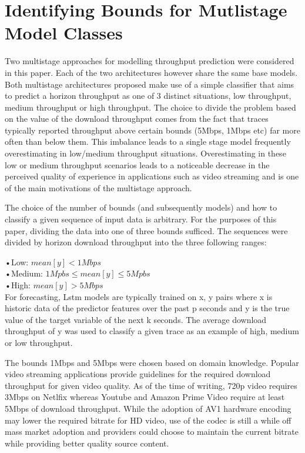 \section{Identifying Bounds for Mutlistage Model Classes}
\label{sec:bounds}
Two multistage approaches for modelling throughput prediction were considered in this paper. Each of the two architectures however share the same base models. Both multistage architectures proposed make use of a simple classifier that aims to predict a horizon throughput as one of 3 distinct situations, low throughput, medium throughput or high throughput. The choice to divide the problem based on the value of the download throughput comes from the fact that traces typically reported throughput above certain bounds (5Mbps, 1Mbps etc) far more often than below them. This imbalance leads to a single stage model frequently overestimating in low/medium throughput situations. Overestimating in these low or medium throughput scenarios leads to a noticeable decrease in the perceived quality of experience in applications such as video streaming \cite{raca2019improving} and is one of the main motivations of the multistage approach. 

The choice of the number of bounds (and subsequently models) and how to classify a given sequence of input data is arbitrary. For the purposes of this paper, dividing the data into one of three bounds sufficed. The sequences were divided by horizon download throughput into the three following ranges:

•Low: $ mean[y] < 1Mbps$ \\
•Medium: $1Mpbs \leq mean[y] \leq 5Mpbs$ \\
•High: $ mean[y] > 5Mbps$ \\

For forecasting, Lstm models are typically trained on x, y pairs where x is historic data of the predictor features over the past p seconds and y is the true value of the target variable of the next k seconds. The average download throughput of y was used to classify a given trace as an example of high, medium or low throughput.

The bounds 1Mbps and 5Mbps were chosen based on domain knowledge. Popular video streaming applications provide guidelines for the required download throughput for given video quality. As of the time of writing, 720p video requires 3Mbps on Netlfix whereas Youtube and Amazon Prime Video require at least 5Mbps of download throughput. While the adoption of AV1 hardware encoding may lower the required bitrate for HD video, use of the codec is still a while off mass market adoption and providers could choose to maintain the current bitrate while providing better quality source content.

